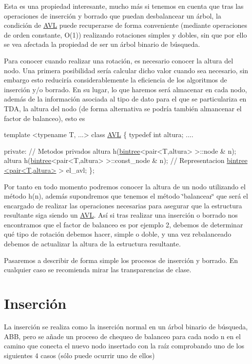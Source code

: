 Esta es una propiedad interesante, mucho más si tenemos en cuenta que tras las operaciones de inserción y borrado que puedan desbalancear un árbol, la condición de \hyperlink{classAVL}{A\-V\-L} puede recuperarse de forma conveniente (mediante operaciones de orden constante, O(1)) realizando rotaciones simples y dobles, sin que por ello se vea afectada la propiedad de ser un árbol binario de búsqueda.

Para conocer cuando realizar una rotación, es necesario conocer la altura del nodo. Una primera posibilidad sería calcular dicho valor cuando sea necesario, sin embargo esto reduciría considerablemente la eficiencia de los algoritmos de inserción y/o borrado. En su lugar, lo que haremos será almacenar en cada nodo, además de la información asociada al tipo de dato para el que se particulariza en T\-D\-A, la altura del nodo (de forma alternativa se podría también almancenar el factor de balanceo), esto es


\begin{DoxyCode}
\textcolor{keyword}{template} <\textcolor{keyword}{typename} T, ...>
\textcolor{keyword}{class }\hyperlink{classAVL}{AVL} \{
\textcolor{keyword}{typedef} \textcolor{keywordtype}{int} altura;
....

\textcolor{keyword}{private}:
  \textcolor{comment}{// Metodos privados}
   altura h(\hyperlink{classbintree}{bintree}<pair<T,altura> >::node & n);
   altura h(\hyperlink{classbintree}{bintree}<pair<T,altura> >::const\_node & n);
 \textcolor{comment}{// Representacion}
  \hyperlink{classbintree}{bintree <pair<T,altura>} > el\_avl;
\};
\end{DoxyCode}


Por tanto en todo momento podremos conocer la altura de un nodo utilizando el método h(n), además supondremos que tenemos el método \char`\"{}balancear\char`\"{} que será el encargado de realizar las operaciones necesarias para asegurar que la estructura resultante siga siendo un \hyperlink{classAVL}{A\-V\-L}. Así si tras realizar una inserción o borrado nos encontramos que el factor de balanceo es por ejemplo 2, debemos de determinar qué tipo de rotación debemos hacer, simple o doble, y una vez rebalanceado debemos de actualizar la altura de la estructura resultante.

Pasaremos a describir de forma simple los procesos de inserción y borrado. En cualquier caso se recomienda mirar las transparencias de clase.\hypertarget{index_Insercion}{}\section{Inserción}\label{index_Insercion}
La inserción se realiza como la inserción normal en un árbol binario de búsqueda, A\-B\-B, pero se añade un proceso de chequeo de balanceo para cada nodo n en el camino que conecta el nuevo nodo insertado con la raíz comprobando uno de los siguientes 4 casos (sólo puede ocurrir uno de ellos)

